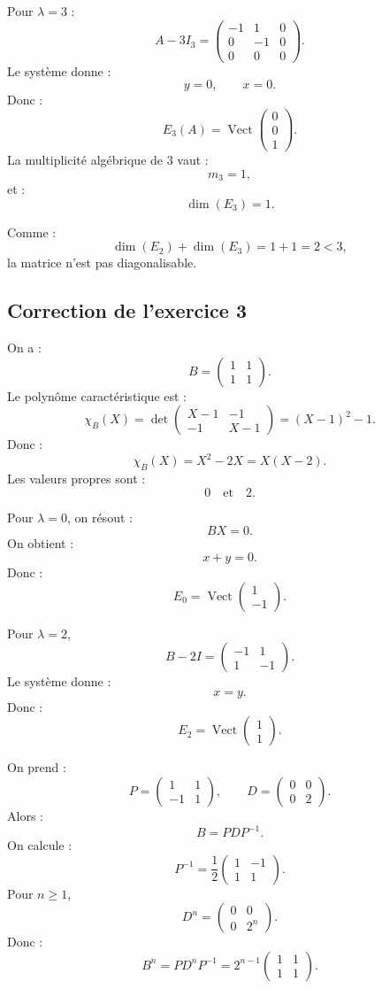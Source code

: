 \documentclass[11pt,a4paper]{article}
\newcommand{\Vect}{\operatorname{Vect}}
\begin{document}
Pour \(\lambda=3\) :
\[
A-3I_3=
\begin{pmatrix}
-1&1&0\\
0&-1&0\\
0&0&0
\end{pmatrix}.
\]
Le système donne :
\[
y=0,
\qquad
x=0.
\]
Donc :
\[
E_3(A)=\Vect
\begin{pmatrix}
0\\0\\1
\end{pmatrix}.
\]
La multiplicité algébrique de \(3\) vaut :
\[
m_3=1,
\]
et :
\[
\dim(E_3)=1.
\]

Comme :
\[
\dim(E_2)+\dim(E_3)=1+1=2<3,
\]
la matrice n'est pas diagonalisable.

\subsection*{Correction de l'exercice 3}

On a :
\[
B=
\begin{pmatrix}
1&1\\
1&1
\end{pmatrix}.
\]
Le polynôme caractéristique est :
\[
\chi_B(X)=
\det
\begin{pmatrix}
X-1&-1\\
-1&X-1
\end{pmatrix}
=
(X-1)^2-1.
\]
Donc :
\[
\chi_B(X)=X^2-2X=X(X-2).
\]
Les valeurs propres sont :
\[
0
\quad\text{et}\quad
2.
\]

Pour \(\lambda=0\), on résout :
\[
BX=0.
\]
On obtient :
\[
x+y=0.
\]
Donc :
\[
E_0=\Vect
\begin{pmatrix}
1\\-1
\end{pmatrix}.
\]

Pour \(\lambda=2\),
\[
B-2I=
\begin{pmatrix}
-1&1\\
1&-1
\end{pmatrix}.
\]
Le système donne :
\[
x=y.
\]
Donc :
\[
E_2=\Vect
\begin{pmatrix}
1\\1
\end{pmatrix}.
\]

On prend :
\[
P=
\begin{pmatrix}
1&1\\
-1&1
\end{pmatrix},
\qquad
D=
\begin{pmatrix}
0&0\\
0&2
\end{pmatrix}.
\]
Alors :
\[
B=PDP^{-1}.
\]
On calcule :
\[
P^{-1}
=
\frac12
\begin{pmatrix}
1&-1\\
1&1
\end{pmatrix}.
\]
Pour \(n\geq1\),
\[
D^n=
\begin{pmatrix}
0&0\\
0&2^n
\end{pmatrix}.
\]
Donc :
\[
B^n=PD^nP^{-1}
=
2^{n-1}
\begin{pmatrix}
1&1\\
1&1
\end{pmatrix}.
\]
\end{document}
